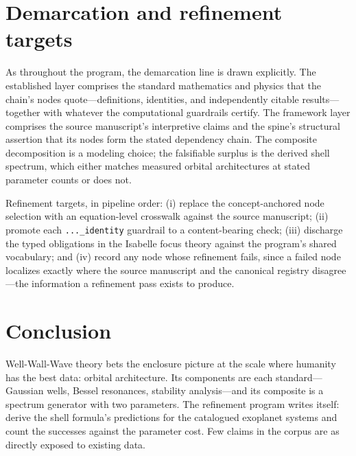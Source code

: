 \documentclass[11pt]{article}
\theoremstyle{remark}
\begin{document}
\section{Demarcation and refinement targets}
\label{sec:demarc}

As throughout the program, the demarcation line is drawn explicitly. The established layer comprises the standard mathematics and physics that the chain's nodes quote---definitions, identities, and independently citable results---together with whatever the computational guardrails certify. The framework layer comprises the source manuscript's interpretive claims and the spine's structural assertion that its nodes form the stated dependency chain. The composite decomposition is a modeling choice; the falsifiable surplus is the derived shell spectrum, which either matches measured orbital architectures at stated parameter counts or does not.

Refinement targets, in pipeline order: (i) replace the concept-anchored node selection with an equation-level crosswalk against the source manuscript; (ii) promote each \texttt{...\_identity} guardrail to a content-bearing check; (iii) discharge the typed obligations in the Isabelle focus theory against the program's shared vocabulary; and (iv) record any node whose refinement fails, since a failed node localizes exactly where the source manuscript and the canonical registry disagree---the information a refinement pass exists to produce.

\section{Conclusion}
\label{sec:conc}

Well-Wall-Wave theory bets the enclosure picture at the scale where humanity has the best data: orbital architecture. Its components are each standard---Gaussian wells, Bessel resonances, stability analysis---and its composite is a spectrum generator with two parameters. The refinement program writes itself: derive the shell formula's predictions for the catalogued exoplanet systems and count the successes against the parameter cost. Few claims in the corpus are as directly exposed to existing data.
\end{document}
